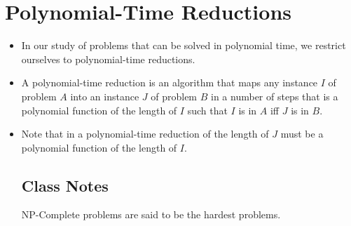 \documentclass[]{article}
\begin{document}
\section{Polynomial-Time Reductions}
\begin{itemize}
\item In our study of problems that can be solved in polynomial time, we
restrict ourselves to polynomial-time reductions.
\item A polynomial-time reduction is an algorithm that maps any instance $I$ of
problem $A$ into an instance $J$ of problem $B$ in a number of steps that is a
polynomial function of the length of $I$ such that $I$ is in $A$ iff $J$ is in
$B$.
\item Note that in a polynomial-time reduction of the length of $J$ must be a
polynomial function of the length of $I$.
\subsection*{Class Notes}
NP-Complete problems are said to be the hardest problems.
\end{itemize}
\end{document}
